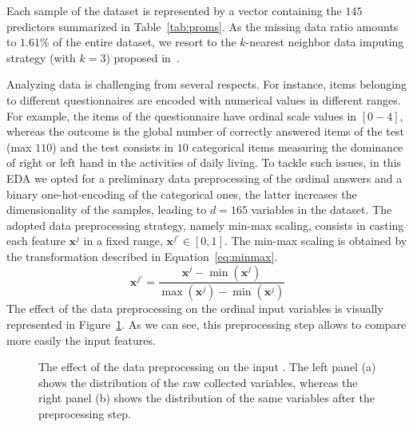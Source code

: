 Each sample of the dataset is represented by a vector containing the $145$ predictors summarized in Table~\ref{tab:proms}.
As the missing data ratio amounts to $1.61\%$ of the entire dataset, we resort to the $k$-nearest neighbor data imputing strategy (with $k=3$) proposed in~\cite{troyanskaya2001missing}.

Analyzing \PCO data is challenging from several respects.
For instance, items belonging to different questionnaires are encoded with numerical values in different ranges.
For example, the items of the \MFIS questionnaire have ordinal scale values in $[0-4]$, whereas the \SDMT outcome is the global number of correctly answered items of the test (max $110$) and the \EDINB test consists in $10$ categorical items measuring the dominance of right or left hand in the activities of daily living.
To tackle such issues, in this EDA we opted for a preliminary data preprocessing of the ordinal answers and a binary one-hot-encoding of the categorical ones, the latter increases the dimensionality of the samples, leading to $d=165$ variables in the dataset.
The adopted data preprocessing strategy, namely min-max scaling, consists in casting each feature $\bm{x}^j$ in a fixed range, \ie $\bm{x}^{j'} \in [0, 1]$. The min-max scaling is obtained by the transformation described in Equation~\eqref{eq:minmax}.
\begin{equation} \label{eq:minmax}
	\bm{x}^{j'} = \frac{\bm{x}^j - \min(\bm{x}^j)}{\max(\bm{x}^j) - \min(\bm{x}^j)}
\end{equation}
The effect of the data preprocessing on the ordinal input variables is visually represented in Figure~\ref{fig:ms_boxplots}. As we can see, this preprocessing step allows to compare more easily the input features.

\begin{figure}[]
	\centering
	\caption{The effect of the data preprocessing on the input \PCOs. The left panel (a) shows the distribution of the raw collected variables, whereas the right panel (b) shows the distribution of the same variables after the preprocessing step.}\label{fig:ms_boxplots}
\end{figure}

